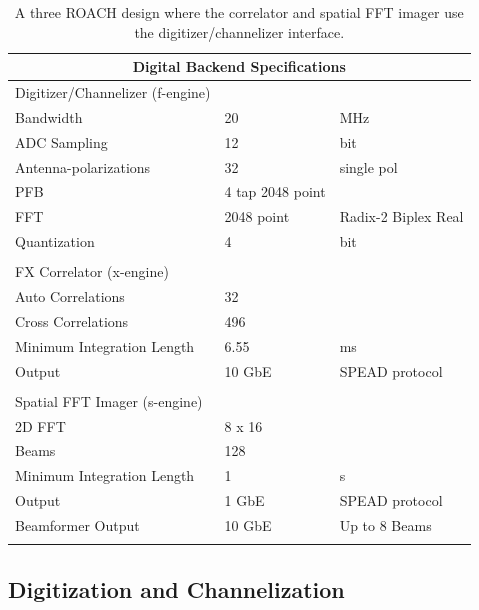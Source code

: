 \documentclass[useAMS,usenatbib,onecolumn]{mn2e}
\begin{document}
\begin{table}
\begin{center}
\begin{tabular}{| l | l | l |}
\hline
\multicolumn{3}{|c|}{Digital Backend Specifications}\\
\hline
Digitizer/Channelizer (f-engine) & &\\
\hline
Bandwidth & 20 & MHz\\
ADC Sampling & 12 & bit \\
Antenna-polarizations & 32 & single pol \\
PFB & 4 tap 2048 point & \\
FFT & 2048 point & Radix-2 Biplex Real\\
Quantization & 4 & bit\\
& & \\
\hline
FX Correlator (x-engine) & &\\
\hline
Auto Correlations & 32 & \\
Cross Correlations & 496 & \\
Minimum Integration Length & 6.55 & ms\\
Output & 10 GbE & SPEAD protocol\\
& & \\
\hline
Spatial FFT Imager (s-engine) & &\\
\hline
2D FFT & 8 x 16 & \\
Beams & 128 & \\
Minimum Integration Length & 1 & s\\
Output & 1 GbE & SPEAD protocol\\
Beamformer Output & 10 GbE & Up to 8 Beams\\
& & \\
\hline
\end{tabular}
\caption{A three ROACH design where the correlator and spatial FFT imager use the digitizer/channelizer interface.}
\label{tbl:digital_specs}
\end{center}
\end{table}

\subsection{Digitization and Channelization}
\end{document}
